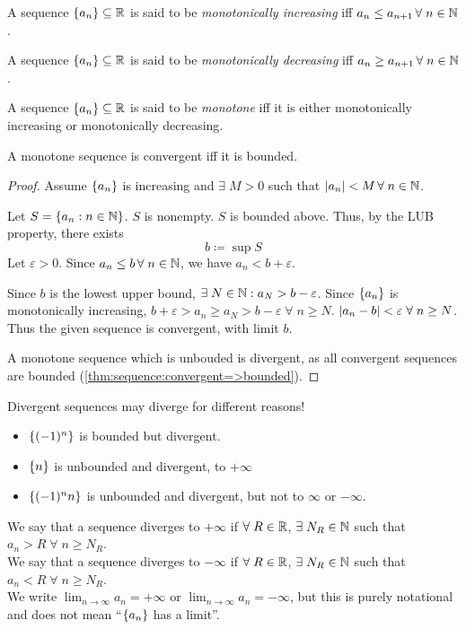 \begin{defn} \label{defn:sequence:monotone}
    A sequence $\set{a_{n}} \subseteq \R$ is said to be \emph{monotonically increasing} iff $a_{n} \leq a_{n+1} \,\forall\; n \in \mathbb{N}$.

    A sequence $\set{a_{n}} \subseteq \R$ is said to be \emph{monotonically decreasing} iff $a_{n} \geq a_{n+1} \,\forall\; n \in \mathbb{N}$.

    A sequence $\set{a_{n}} \subseteq \R$ is said to be \emph{monotone} iff it is either monotonically increasing or monotonically decreasing.
\end{defn}

\begin{thm} \label{thm:sequence:MCT}
    A monotone sequence is convergent iff it is bounded.
\end{thm}
\begin{proof}
    Assume $\set{a_{n}}$ is increasing and $\exists\; M > 0$ such that $\abs{a_{n}} < M \,\forall\; n \in \N$.

    Let $S = \set{a_{n} : n \in \N}$.
    $S$ is nonempty. $S$ is bounded above.
    Thus, by the LUB property, there exists \[
        b \coloneqq \sup S
    \] Let $\varepsilon > 0$.
    Since $a_{n} \leq b \,\forall\; n \in \mathbb{N}$, we have $a_{n} < b + \varepsilon$.

    Since $b$ is the lowest upper bound, $\exists\; N \in \mathbb{N} : a_{N} > b - \varepsilon$.
    Since $\set{a_{n}}$ is monotonically increasing, $b + \varepsilon > a_{n} \geq a_{N} > b - \varepsilon \;\forall\; n \geq N$.
    $\abs{a_{n} - b} < \varepsilon \;\forall\; n \geq N$. Thus the given sequence is convergent, with limit $b$.

    A monotone sequence which is unbouded is divergent, as all convergent sequences are bounded (\cref{thm:sequence:convergent=>bounded}).
\end{proof}

\begin{rem}[Warning!]
    Divergent sequences may diverge for different reasons!
    \begin{itemize}
        \item $\set{(-1)^{n}}$ is bounded but divergent.
        \item $\set{n}$ is unbounded and divergent, to $+\infty$
        \item $\set{(-1)^{n}n}$ is unbounded and divergent, but not to $\infty$ or $-\infty$.
    \end{itemize}
\end{rem}
\begin{defn} \label{defn:sequence:diverging_to_infinity}
    We say that a sequence diverges to $+\infty$ if $\forall\; R \in \mathbb{R}$, $\exists\; N_{R} \in \mathbb{N}$ such that $a_{n} > R \;\forall\; n \geq N_{R}$. \\
    We say that a sequence diverges to $-\infty$ if $\forall\; R \in \mathbb{R}$, $\exists\; N_{R} \in \mathbb{N}$ such that $a_{n} < R \;\forall\; n \geq N_{R}$. \\
    We write $\lim_{n \to \infty} a_{n} = +\infty$ or $\lim_{n \to \infty} a_{n} = -\infty$, but this is purely notational and does not mean ``$\set{a_{n}}$ has a limit''.
\end{defn}
